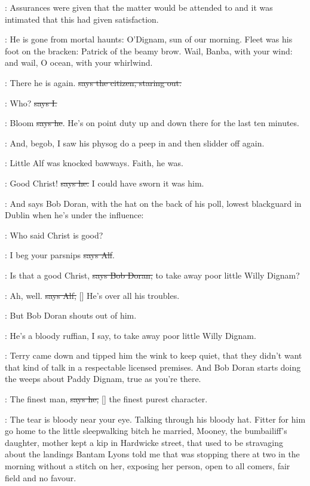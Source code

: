:
Assurances were given that the matter would be attended to and it was
intimated that this had given satisfaction.

:
He is gone from mortal haunts: O'Dignam, sun of our morning. Fleet
was his foot on the bracken: Patrick of the beamy brow. Wail, Banba, with
your wind: and wail, O ocean, with your whirlwind.

\citizen:
There he is again.
\sout{says the citizen, staring out.}

:
Who? \sout{says I.}

\citizen:
Bloom \sout{says he}.
He's on point duty up and down there for the last ten
minutes.

\Nq:
And, begob, I saw his physog do a peep in
and then slidder off again.

\Nq:
Little Alf was knocked bawways. Faith, he was.

\bergan:
Good Christ! \sout{says he.}
I could have sworn it was him.

\Nq:
And says Bob Doran, with the hat on the back of his poll, lowest
blackguard in Dublin when he's under the influence:

\doran:
Who said Christ is good?

\bergan:
I beg your parsnips \sout{says Alf}.

\doran:
Is that a good Christ, \sout{says Bob Doran,}
to take away poor little Willy
Dignam?

\bergan:
Ah, well. \sout{says Alf,}
[]
He's over all his troubles.

\Nq:
But Bob Doran shouts out of him.

\doran:
He's a bloody ruffian, I say,
to take away poor little Willy Dignam.

\Nq:
Terry came down and tipped him the wink to keep quiet, that they
didn't want that kind of talk in a respectable licensed premises. And Bob
Doran starts doing the weeps about Paddy Dignam, true as you're there.

\doran:
The finest man, \sout{says he,}
[] the finest purest character.

\Nq:
The tear is bloody near your eye. Talking through his bloody hat.
Fitter for him go home to the little sleepwalking bitch he married,
Mooney, the bumbailiff's daughter, mother kept a kip in Hardwicke street,
that used to be stravaging about the landings Bantam Lyons told me that
was stopping there at two in the morning without a stitch on her, exposing
her person, open to all comers, fair field and no favour.


